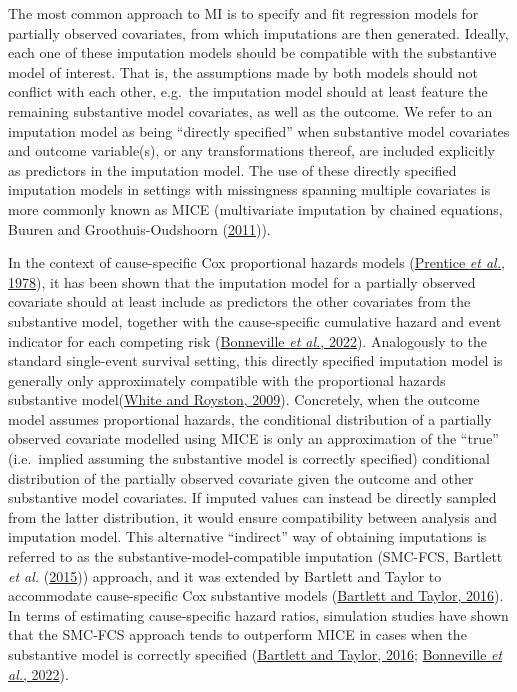 \documentclass[
  letterpaper,
  DIV=11,
  numbers=noendperiod]{scrreprt}
\begin{document}
The most common approach to MI is to specify and fit regression models
for partially observed covariates, from which imputations are then
generated. Ideally, each one of these imputation models should be
compatible with the substantive model of interest. That is, the
assumptions made by both models should not conflict with each other,
e.g.~the imputation model should at least feature the remaining
substantive model covariates, as well as the outcome. We refer to an
imputation model as being ``directly specified'' when substantive model
covariates and outcome variable(s), or any transformations thereof, are
included explicitly as predictors in the imputation model. The use of
these directly specified imputation models in settings with missingness
spanning multiple covariates is more commonly known as MICE
(multivariate imputation by chained equations, Buuren and
Groothuis-Oudshoorn
(\protect\hyperlink{ref-buurenMiceMultivariateImputation2011}{2011})).

In the context of cause-specific Cox proportional hazards models
(\protect\hyperlink{ref-prenticeAnalysisFailureTimes1978}{Prentice
\emph{et al.}, 1978}), it has been shown that the imputation model for a
partially observed covariate should at least include as predictors the
other covariates from the substantive model, together with the
cause-specific cumulative hazard and event indicator for each competing
risk
(\protect\hyperlink{ref-bonnevilleMultipleImputationCausespecific2022}{Bonneville
\emph{et al.}, 2022}). Analogously to the standard single-event survival
setting, this directly specified imputation model is generally only
approximately compatible with the proportional hazards substantive
model(\protect\hyperlink{ref-whiteImputingMissingCovariate2009}{White
and Royston, 2009}). Concretely, when the outcome model assumes
proportional hazards, the conditional distribution of a partially
observed covariate modelled using MICE is only an approximation of the
``true'' (i.e.~implied assuming the substantive model is correctly
specified) conditional distribution of the partially observed covariate
given the outcome and other substantive model covariates. If imputed
values can instead be directly sampled from the latter distribution, it
would ensure compatibility between analysis and imputation model. This
alternative ``indirect'' way of obtaining imputations is referred to as
the substantive-model-compatible imputation (SMC-FCS, Bartlett \emph{et
al.}
(\protect\hyperlink{ref-bartlettMultipleImputationCovariates2015}{2015}))
approach, and it was extended by Bartlett and Taylor to accommodate
cause-specific Cox substantive models
(\protect\hyperlink{ref-bartlettMissingCovariatesCompeting2016}{Bartlett
and Taylor, 2016}). In terms of estimating cause-specific hazard ratios,
simulation studies have shown that the SMC-FCS approach tends to
outperform MICE in cases when the substantive model is correctly
specified
(\protect\hyperlink{ref-bartlettMissingCovariatesCompeting2016}{Bartlett
and Taylor, 2016};
\protect\hyperlink{ref-bonnevilleMultipleImputationCausespecific2022}{Bonneville
\emph{et al.}, 2022}).
\end{document}
